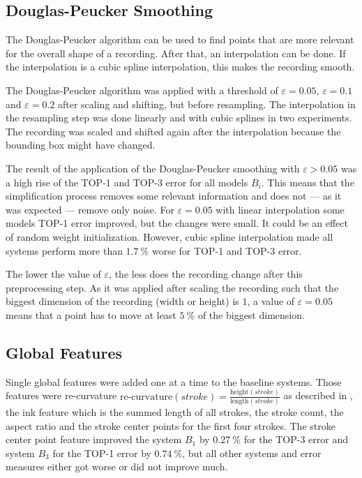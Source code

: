 \documentclass[9pt,technote]{IEEEtran}
\begin{document}
\subsection{Douglas-Peucker Smoothing}
The Douglas-Peucker algorithm can be used to find
points that are more relevant for the overall shape of a recording. After that,
an interpolation can be done. If the interpolation is a cubic spline
interpolation, this makes the recording smooth.

The Douglas-Peucker algorithm was applied with a threshold of $\varepsilon =
0.05$, $\varepsilon = 0.1$ and $\varepsilon = 0.2$ after scaling and shifting,
but before resampling. The interpolation in the resampling step was done
linearly and with cubic splines in two experiments. The recording was scaled
and shifted again after the interpolation because the bounding box might have
changed.

The result of the application of the Douglas-Peucker smoothing with $\varepsilon
> 0.05$ was a high rise of the TOP-1 and TOP-3 error for all models $B_i$.
This means that the simplification process removes some relevant information and
does not --- as it was expected --- remove only noise. For $\varepsilon = 0.05$
with linear interpolation some models TOP-1 error improved, but the
changes were small. It could be an effect of random weight initialization.
However, cubic spline interpolation made all systems perform more than
$\SI{1.7}{\percent}$ worse for TOP-1 and TOP-3 error.

The lower the value of $\varepsilon$, the less does the recording change after
this preprocessing step. As it was applied after scaling the recording such that
the biggest dimension of the recording (width or height) is $1$, a value of
$\varepsilon = 0.05$ means that a point has to move at least $\SI{5}{\percent}$
of the biggest dimension.

\subsection{Global Features}
Single global features were added one at a time to the baseline systems. Those
features were re-curvature $\text{re-curvature}(stroke) = \frac{\text{height}(stroke)}{\text{length}(stroke)}$
as described in \cite{Huang06}, the ink feature which is the summed length
of all strokes, the stroke count, the aspect ratio and the stroke center points
for the first four strokes. The stroke center point feature improved the system
$B_1$ by $\SI{0.27}{\percent}$ for the TOP-3 error and system $B_3$ for the
TOP-1 error by $\SI{0.74}{\percent}$, but all other systems and error measures
either got worse or did not improve much.
\end{document}
